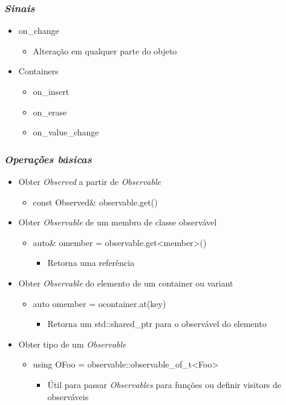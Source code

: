 \documentclass[t]{beamer}
\begin{document}
\begin{frame}[fragile]
  \frametitle{\textit{Sinais}}
  \begin{itemize}
    \item<1->{on\_change}
      \begin{itemize}
        \item{Alteração em qualquer parte do objeto}
      \end{itemize}
    \item<2->{Containers}
      \begin{itemize}
        \item{on\_insert}
        \item{on\_erase}
        \item{on\_value\_change}
      \end{itemize}
  \end{itemize}
\end{frame}

\begin{frame}[fragile]
  \frametitle{\textit{Operações básicas}}

  \begin{itemize}
  \item<1->{Obter \textit{Observed} a partir de \textit{Observable}}
    \begin{itemize}
    \item<1->{const Observed\& observable.get()}
    \end{itemize}
  \item<2->{Obter \textit{Observable} de um membro de classe observável}
    \begin{itemize}
    \item<2->{auto\& omember = observable.get<member>()}
      \begin{itemize}
      \item<3->{Retorna uma referência}
      \end{itemize}
    \end{itemize}
  \item<4->{Obter \textit{Observable} do elemento de um container ou variant}
    \begin{itemize}
    \item<4->{auto omember = ocontainer.at(key)}
      \begin{itemize}
      \item<5->{Retorna um std::shared\_ptr para o observável do elemento}
      \end{itemize}
    \end{itemize}
  \item<5->{Obter tipo de um \textit{Observable}}
    \begin{itemize}
    \item<5->{using OFoo = observable::observable\_of\_t<Foo>}
      \begin{itemize}
      \item<6->{Útil para passar \textit{Observables} para funções ou definir visitors de observáveis}
      \end{itemize}
    \end{itemize}
  \end{itemize}
\end{frame}
\end{document}

